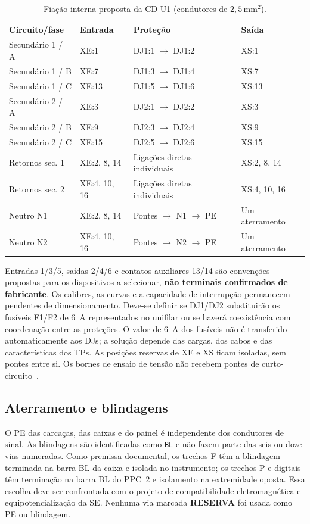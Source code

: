 \documentclass[11pt,a4paper]{article}
\newcommand{\tagg}[1]{\texttt{#1}}
\newcommand{\res}{\textbf{RESERVA}}
\begin{document}
\begin{table}[htbp]\centering\small
\caption{Fiação interna proposta da CD-U1 (condutores de $2{,}5\,\mathrm{mm^2}$).}
\begin{tabularx}{\linewidth}{@{}L{2.8cm}L{3.3cm}L{3.5cm}Y@{}}\toprule
Circuito/fase & Entrada & Proteção & Saída \\\midrule
Secundário 1 / A & XE:1 & DJ1:1 $\to$ DJ1:2 & XS:1\\
Secundário 1 / B & XE:7 & DJ1:3 $\to$ DJ1:4 & XS:7\\
Secundário 1 / C & XE:13 & DJ1:5 $\to$ DJ1:6 & XS:13\\
Secundário 2 / A & XE:3 & DJ2:1 $\to$ DJ2:2 & XS:3\\
Secundário 2 / B & XE:9 & DJ2:3 $\to$ DJ2:4 & XS:9\\
Secundário 2 / C & XE:15 & DJ2:5 $\to$ DJ2:6 & XS:15\\
Retornos sec. 1 & XE:2, 8, 14 & Ligações diretas individuais & XS:2, 8, 14\\
Retornos sec. 2 & XE:4, 10, 16 & Ligações diretas individuais & XS:4, 10, 16\\
Neutro N1 & XE:2, 8, 14 & Pontes $\to$ N1 $\to$ PE & Um aterramento\\
Neutro N2 & XE:4, 10, 16 & Pontes $\to$ N2 $\to$ PE & Um aterramento\\\bottomrule
\end{tabularx}\end{table}
Entradas 1/3/5, saídas 2/4/6 e contatos auxiliares 13/14 são convenções
propostas para os dispositivos a selecionar, \textbf{não terminais confirmados
de fabricante}. Os calibres, as curvas e a capacidade de interrupção permanecem
pendentes de dimensionamento. Deve-se definir se DJ1/DJ2 substituirão os fusíveis
F1/F2 de 6~A representados no unifilar ou se haverá coexistência com coordenação
entre as proteções. O valor de 6~A dos fusíveis não é transferido automaticamente
aos DJs; a solução depende das cargas, dos cabos e das características dos TPs.
As posições reservas de XE e XS ficam isoladas, sem pontes entre si.
Os bornes de ensaio de tensão não recebem pontes de curto-circuito~\cite{tpseguro}.

\subsection{Aterramento e blindagens}
O PE das carcaças, das caixas e do painel é independente dos condutores de sinal.
As blindagens são identificadas como \tagg{BL} e não fazem parte das seis ou doze
vias numeradas. Como premissa documental, os trechos F têm a blindagem terminada
na barra BL da caixa e isolada no instrumento; os trechos P e digitais têm
terminação na barra BL do PPC~2 e isolamento na extremidade oposta. Essa escolha
deve ser confrontada com o projeto de compatibilidade eletromagnética e
equipotencialização da SE. Nenhuma via marcada \res{} foi usada como PE ou blindagem.
\end{document}
